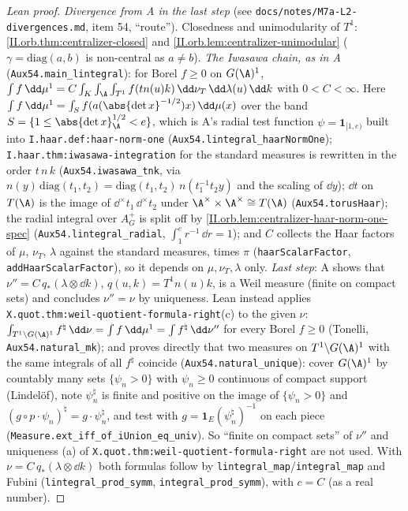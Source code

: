 \begin{proof}[Lean proof]
\emph{Divergence from A in the last step} (see \texttt{docs/notes/M7a-L2-divergences.md}, item 54, ``route''). Closedness and unimodularity of $T^1$: \cref{II.orb.thm:centralizer-closed} and \cref{II.orb.lem:centralizer-unimodular} ($\gamma=\mathrm{diag}(a,b)$ is non-central as $a\ne b$). \emph{The Iwasawa chain, as in A} (\texttt{Aux54.main\_lintegral}): for Borel $f\ge0$ on $G(\A)^1$, $\int f\,\dd\mu^1=C\int_K\int_\A\int_{T^1}f(tn(u)k)\,\dd\nu_T\,\dd\lambda(u)\,\dd k$ with $0<C<\infty$. Here $\int f\,\dd\mu^1=\int_S f(a(\abs{\det x}^{-1/2})x)\,\dd\mu(x)$ over the band $S=\{1\le\abs{\det x}_\A^{1/2}<e\}$, which is A's radial test function $\psi=\mathbf 1_{[1,e)}$ built into \texttt{I.haar.def:haar-norm-one} (\texttt{Aux54.lintegral\_haarNormOne}); \texttt{I.haar.thm:iwasawa-integration} for the standard measures is rewritten in the order $t\,n\,k$ (\texttt{Aux54.iwasawa\_tnk}, via $n(y)\,\mathrm{diag}(t_1,t_2)=\mathrm{diag}(t_1,t_2)\,n(t_1^{-1}t_2y)$ and the scaling of $\dd y$); $\dd t$ on $T(\A)$ is the image of $\dd^\times t_1\,\dd^\times t_2$ under $\A^\times\times\A^\times\cong T(\A)$ (\texttt{Aux54.torusHaar}); the radial integral over $A_G^+$ is split off by \cref{II.orb.lem:centralizer-haar-norm-one-spec} (\texttt{Aux54.lintegral\_radial}, $\int_1^er^{-1}\,\dd r=1$); and $C$ collects the Haar factors of $\mu$, $\nu_T$, $\lambda$ against the standard measures, times $\pi$ (\texttt{haarScalarFactor}, \texttt{addHaarScalarFactor}), so it depends on $\mu,\nu_T,\lambda$ only. \emph{Last step}: A shows that $\nu''=C\,q_*(\lambda\otimes\dd k)$, $q(u,k)=T^1n(u)k$, is a Weil measure (finite on compact sets) and concludes $\nu''=\nu$ by uniqueness. Lean instead applies \texttt{X.quot.thm:weil-quotient-formula-right}(c) to the given $\nu$: $\int_{T^1\backslash G(\A)^1}f^\natural\,\dd\nu=\int f\,\dd\mu^1=\int f^\natural\,\dd\nu''$ for every Borel $f\ge0$ (Tonelli, \texttt{Aux54.natural\_mk}); and proves directly that two measures on $T^1\backslash G(\A)^1$ with the same integrals of all $f^\natural$ coincide (\texttt{Aux54.natural\_unique}): cover $G(\A)^1$ by countably many sets $\{\psi_n>0\}$ with $\psi_n\ge0$ continuous of compact support (Lindel\"of), note $\psi_n^\natural$ is finite and positive on the image of $\{\psi_n>0\}$ and $(g\circ p\cdot\psi_n)^\natural=g\cdot\psi_n^\natural$, and test with $g=\mathbf 1_E(\psi_n^\natural)^{-1}$ on each piece (\texttt{Measure.ext\_iff\_of\_iUnion\_eq\_univ}). So ``finite on compact sets'' of $\nu''$ and uniqueness (a) of \texttt{X.quot.thm:weil-quotient-formula-right} are not used. With $\nu=C\,q_*(\lambda\otimes\dd k)$ both formulas follow by \texttt{lintegral\_map}/\texttt{integral\_map} and Fubini (\texttt{lintegral\_prod\_symm}, \texttt{integral\_prod\_symm}), with $c=C$ (as a real number).
\end{proof}

